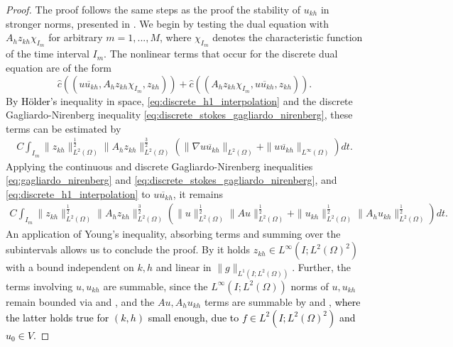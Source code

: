 \documentclass{m2an}
\newcommand\blue[1]{\textcolor{black}{#1}}
\newcommand{\chatIO}[1]{\hat c \left(\!\left( #1 \right)\!\right)}
\newcommand{\uukh}{\overline{uu_{kh}}}
\newcommand{\ukh}{u_{kh}}
\newcommand{\zkh}{z_{kh}}
\newcommand{\LtwoHone}{L^2(I;H^1(\Omega))}
\newcommand{\dualrhs}{g}
\begin{document}
\begin{proof}
  The proof follows the same steps as the proof the stability of $\ukh$ in stronger norms, presented in
  .
  We begin by testing the dual equation with $A_h \zkh \chi_{I_{m}}$ for arbitrary $m=1,...,M$,
  where $\chi_{I_{m}}$ denotes the characteristic function of the time interval $I_{m}$.
  The nonlinear terms that occur for the discrete dual equation are of the form
  \begin{equation*}
    \chatIO{\uukh,A_h \zkh \chi_{I_{m}},\zkh} + \chatIO{A_h \zkh \chi_{I_{m}},\uukh,\zkh}.
  \end{equation*}
  By \blue{Hölder's} inequality in space, \eqref{eq:discrete_h1_interpolation} and
  the discrete Gagliardo-Nirenberg inequality \eqref{eq:discrete_stokes_gagliardo_nirenberg}, these
  terms can be estimated by
  \begin{align*}
     C \int_{I_{m}} \|\zkh\|_{L^2(\Omega)}^{\frac{1}{2}}\|A_h \zkh\|_{L^2(\Omega)}^{\frac{3}{2}}
     \left(\|\nabla \uukh\|_{L^2(\Omega)} + \|\uukh\|_{L^\infty(\Omega)} \right)dt.
  \end{align*}
  Applying the continuous and discrete Gagliardo-Nirenberg inequalities
  \eqref{eq:gagliardo_nirenberg} and \eqref{eq:discrete_stokes_gagliardo_nirenberg}, 
  and \eqref{eq:discrete_h1_interpolation} to $\uukh$, it remains
  \begin{align*}
     C \int_{I_{m}} \|\zkh\|_{L^2(\Omega)}^{\frac{1}{2}}\|A_h \zkh\|_{L^2(\Omega)}^{\frac{3}{2}}
     \left(\|u\|_{L^2(\Omega)}^{\frac{1}{2}}\|A u\|_{L^2(\Omega)}^{\frac{1}{2}}
     + \|\ukh\|_{L^2(\Omega)}^{\frac{1}{2}}\|A_h\ukh\|_{L^2(\Omega)}^{\frac{1}{2}}\right) dt.
  \end{align*}
  An application of Young's inequality, absorbing terms and summing over the subintervals allows us to 
  conclude the proof.
  By  it holds $\zkh \in L^\infty(I;L^2(\Omega)^2)$ with a bound 
  independent on $k,h$ and linear in $\|\dualrhs\|_{L^1(I;L^2(\Omega))}$. 
  Further, the terms involving $u, \ukh$ are summable, since the $L^\infty(I;L^2(\Omega))$ 
  norms of $u, \ukh$ remain bounded via  and
  , and the $Au, A_h \ukh$ terms are summable by
   and , 
  \blue{where the latter holds true for $(k,h)$ small enough, 
  due to $f \in L^2(I;L^2(\Omega)^2)$ and $u_0 \in V$.}

\end{proof}
\end{document}

